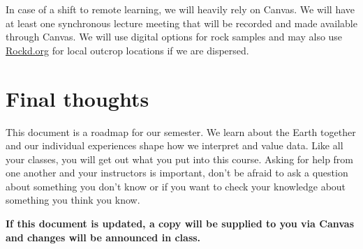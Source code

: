 \documentclass[11pt,]{article}
\begin{document}
In case of a shift to remote learning, we will heavily rely on Canvas.
We will have at least one synchronous lecture meeting that will be
recorded and made available through Canvas. We will use digital options
for rock samples and may also use \href{https://rockd.org/}{Rockd.org}
for local outcrop locations if we are dispersed.

\hypertarget{final-thoughts}{%
\section{Final thoughts}\label{final-thoughts}}

This document is a roadmap for our semester. We learn about the Earth
together and our individual experiences shape how we interpret and value
data. Like all your classes, you will get out what you put into this
course. Asking for help from one another and your instructors is
important, don't be afraid to ask a question about something you don't
know or if you want to check your knowledge about something you think
you know.

\textbf{If this document is updated, a copy will be supplied to you via
Canvas and changes will be announced in class.}
\end{document}
